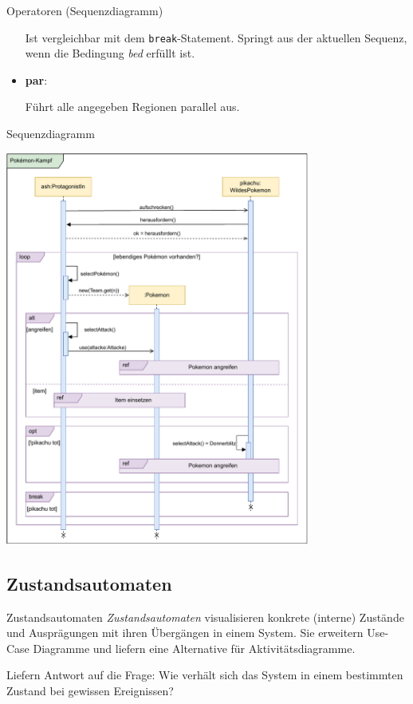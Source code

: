 \begin{diag}{Operatoren (Sequenzdiagramm)}
\begin{itemize}
              Ist vergleichbar mit dem \texttt{break}-Statement.
              Springt aus der aktuellen Sequenz, wenn die Bedingung \emph{bed} erfüllt ist.
        \item \textbf{par}:

              Führt alle angegeben Regionen parallel aus.
    \end{itemize}
\end{diag}

\begin{example}{Sequenzdiagramm}
    \begin{center}
        \includegraphics[width=0.75\textwidth]{includes/figures/example_diagrams_sequenz.pdf}
    \end{center}
\end{example}

\subsection{Zustandsautomaten}

\begin{defi}{Zustandsautomaten}
    \emph{Zustandsautomaten} visualisieren konkrete (interne) Zustände und Ausprägungen mit ihren Übergängen in einem System.
    Sie erweitern Use-Case Diagramme und liefern eine Alternative für Aktivitätsdiagramme.

    Liefern Antwort auf die Frage:
    Wie verhält sich das System in einem bestimmten Zustand bei gewissen Ereignissen?
\end{defi}

